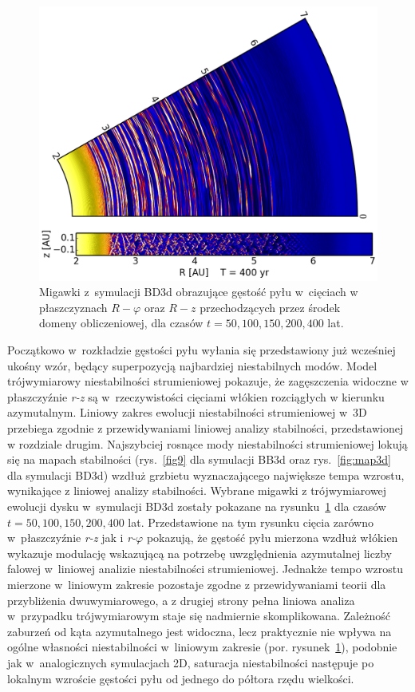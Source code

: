 \begin{figure}
   \includegraphics[width=0.44\linewidth]{figures/slice_nosg_05}
   \caption[Ewolucja gęstości pyłu w~symulacji BD3d.]
     {Migawki z~symulacji BD3d obrazujące gęstość pyłu w~cięciach w
      płaszczyznach $R -\varphi$ oraz $R - z$ przechodzących przez środek 
      domeny obliczeniowej, dla czasów $t= 50, 100, 150, 200, 400$ lat.}
   \label{fig:slicenosg}
\end{figure}
%
Początkowo w~rozkładzie gęstości pyłu wyłania się przedstawiony już wcześniej
ukośny wzór, będący superpozycją najbardziej niestabilnych modów.  Model
trójwymiarowy niestabilności strumieniowej pokazuje, że zagęszczenia widoczne w
płaszczyźnie \textit{r-z} są w~rzeczywistości cięciami włókien rozciągłych w
kierunku azymutalnym. Liniowy zakres ewolucji niestabilności strumieniowej w~3D
przebiega zgodnie z przewidywaniami liniowej analizy stabilności, przedstawionej
w rozdziale drugim. Najszybciej rosnące mody niestabilności
strumieniowej lokują się na mapach stabilności (rys.~\ref{fig9} dla symulacji
BB3d oraz rys.~\ref{fig:map3d} dla symulacji BD3d) wzdłuż grzbietu
wyznaczającego największe tempa wzrostu, wynikające z liniowej
analizy stabilności. Wybrane migawki z trójwymiarowej ewolucji dysku w~symulacji
BD3d zostały pokazane na rysunku~\ref{fig:slicenosg} dla czasów $t =  50, 100,
150, 200, 400$ lat. Przedstawione na tym rysunku cięcia zarówno w~płaszczyźnie
\textit{r-z} jak i \textit{r-}$\varphi$ pokazują, że gęstość pyłu mierzona
wzdłuż włókien wykazuje modulację wskazującą na potrzebę uwzględnienia
azymutalnej liczby falowej w~liniowej analizie niestabilności strumieniowej.
Jednakże tempo wzrostu mierzone w~liniowym zakresie pozostaje zgodne z
przewidywaniami teorii dla przybliżenia dwuwymiarowego, a z drugiej strony pełna
liniowa analiza w~przypadku trójwymiarowym staje się nadmiernie skomplikowana.
Zależność zaburzeń od kąta azymutalnego jest widoczna, lecz praktycznie nie
wpływa na ogólne własności niestabilności w~liniowym zakresie (por.
rysunek~\ref{fig:slicenosg}), podobnie jak w~analogicznych symulacjach 2D,
saturacja niestabilności następuje po lokalnym wzroście gęstości pyłu od jednego
do półtora rzędu wielkości.

